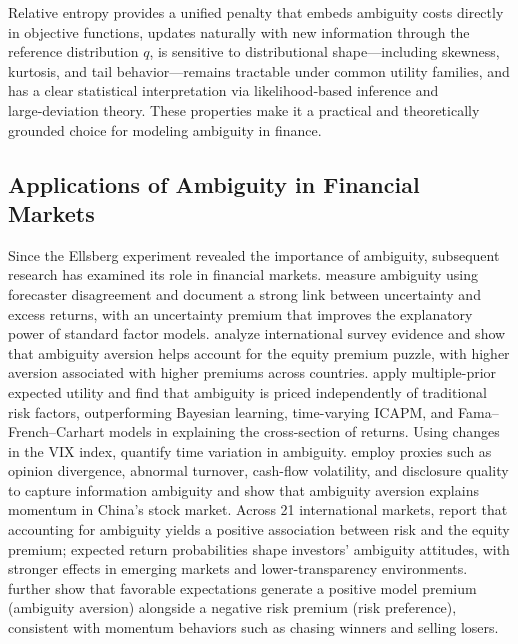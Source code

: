 \documentclass[preprint,12pt,authoryear]{elsarticle}
\begin{document}
Relative entropy provides a unified penalty that embeds ambiguity costs directly in objective functions, updates naturally with new information through the reference distribution $q$, is sensitive to distributional shape—including skewness, kurtosis, and tail behavior—remains tractable under common utility families, and has a clear statistical interpretation via likelihood‑based inference and large‑deviation theory. These properties make it a practical and theoretically grounded choice for modeling ambiguity in finance.


\subsection{Applications of Ambiguity in Financial Markets}

Since the Ellsberg experiment revealed the importance of ambiguity, subsequent research has examined its role in financial markets. \citep{anderson2009} measure ambiguity using forecaster disagreement and document a strong link between uncertainty and excess returns, with an uncertainty premium that improves the explanatory power of standard factor models. \citep{rieger2012} analyze international survey evidence and show that ambiguity aversion helps account for the equity premium puzzle, with higher aversion associated with higher premiums across countries. \citep{ariel2014} apply multiple-prior expected utility and find that ambiguity is priced independently of traditional risk factors, outperforming Bayesian learning, time-varying ICAPM, and Fama–French–Carhart models in explaining the cross-section of returns. Using changes in the VIX index, \citep{williams2015} quantify time variation in ambiguity. \citep{xu2016} employ proxies such as opinion divergence, abnormal turnover, cash-flow volatility, and disclosure quality to capture information ambiguity and show that ambiguity aversion explains momentum in China's stock market. Across 21 international markets, \citep{kim2021} report that accounting for ambiguity yields a positive association between risk and the equity premium; expected return probabilities shape investors' ambiguity attitudes, with stronger effects in emerging markets and lower-transparency environments. \citep{hu2022} further show that favorable expectations generate a positive model premium (ambiguity aversion) alongside a negative risk premium (risk preference), consistent with momentum behaviors such as chasing winners and selling losers.
\end{document}

